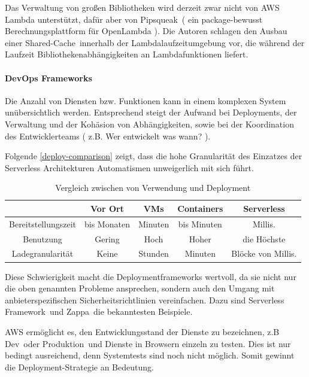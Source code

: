 \documentclass[
12pt,
english,
ngerman,
headsepline,
twoside,
openright,
numbers=noenddot,version=first
]{scrreprt}
\providecommand{\tabularnewline}{\\}
\begin{document}
Das Verwaltung von großen Bibliotheken wird derzeit zwar nicht von \acrshort{AWS} Lambda unterstützt, dafür aber von \glqq Pipsqueak\grqq\ ( ein package-bewusst Berechnungsplattform für OpenLambda \cite{lambdaBibliothek} ). Die Autoren schlagen den Ausbau einer \glqq Shared-Cache\grqq\ innerhalb der Lambdalaufzeitumgebung vor, die während der Laufzeit Bibliothekenabhängigkeiten an Lambdafunktionen liefert.


\paragraph{DevOps Frameworks}\label{devops-critic}
Die Anzahl von Diensten bzw. Funktionen kann in einem komplexen System unübersichtlich werden. Entsprechend steigt der Aufwand bei Deployments, der Verwaltung und der Kohäsion von Abhängigkeiten, sowie bei der Koordination des Entwicklerteams ( z.B. Wer entwickelt was wann? ). 

Folgende \autoref{deploy-comparison} \cite{servStatus} zeigt, dass die hohe Granularität des Einzatzes der Serverless Architekturen Automatismen unweigerlich mit sich führt.

\begin{table}[H]
	\centering{}
	\begin{tabular}{c | c c c c}
		\noalign{\vskip\doublerulesep}
		& Vor Ort & VMs & Containers & Serverless \tabularnewline[\doublerulesep]
		\hline
		\noalign{\vskip\doublerulesep}
		Bereitstellungszeit & bis Monaten & Minuten & bis Minuten & Millis. \tabularnewline[\doublerulesep]
		\noalign{\vskip\doublerulesep}
		\noalign{\vskip\doublerulesep}
		Benutzung & Gering & Hoch & Hoher & die Höchste \tabularnewline[\doublerulesep]
		\noalign{\vskip\doublerulesep}
		Ladegranularität & Keine & Stunden & Minuten &  Blöcke von Millis.\tabularnewline[\doublerulesep]
	\end{tabular}
\caption{Vergleich zwischen  von Verwendung und Deployment }
\label{deploy-comparison}
\end{table} 

Diese Schwierigkeit macht die Deploymentframeworks wertvoll, da sie nicht nur die oben genannten Probleme ansprechen, sondern auch den Umgang mit anbieterspezifischen Sicherheitsrichtlinien vereinfachen. Dazu sind \glqq Serverless Framework\grqq\ und \glqq Zappa\grqq\ die bekanntesten Beispiele.

\acrshort{AWS} ermöglicht es, den Entwicklungsstand der Dienste zu bezeichnen, z.B \glqq Dev\grqq\ oder \glqq Produktion\grqq\ und Dienste in Browsern einzeln zu testen. Dies ist nur bedingt ausreichend, denn Systemtests sind noch nicht möglich. Somit gewinnt die Deployment-Strategie an Bedeutung.
\end{document}
